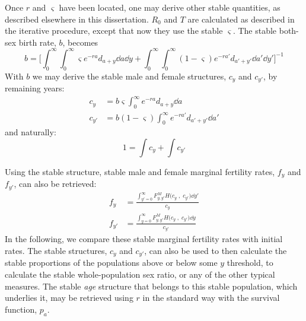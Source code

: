 \FloatBarrier
Once $r$ and $\varsigma$ have been located, one may derive other stable
quantities, as described elsewhere in this dissertation. $R_0$ and $T$ are
calculated as described in the iterative procedure, except that now they use
the stable $\varsigma$. The stable both-sex birth rate, $b$, becomes
\begin{equation}
b = \Bigg[\int_0^\infty  \int _0^\infty \varsigma
 e^{-ra}d_{a+y}\dd a \dd y + \int_0^\infty \int _0^\infty (1-\varsigma)
 e^{-ra'}d_{a'+y'} \dd a' \dd y' \Bigg] ^{-1}
\end{equation}
With $b$ we may derive the stable male and female structures, $c_y$ and
$c_{y'}$, by remaining years:
\begin{align}
\label{eq:schoenexcy}
c_y &= b\varsigma \int _0^\infty e^{-ra}d_{a+y}\dd a \\
c_{y'} &= b(1-\varsigma) \int _0^\infty e^{-ra'}d_{a'+y'}\dd a'
\end{align}
and naturally:
\begin{equation}
1 = \int c_y + \int c_{y'}
\end{equation}

Using the stable structure, stable male and female marginal fertility rates,
$f_y$ and $f_{y'}$, can also be retrieved:
\begin{align}
  f_y &=  \frac{\int_{y'=0}^\infty F_{y,y'}^M H\Big(c_y\;,\; c_{y'}\Big)
  \dd y'}{c_y} \\
  f_{y'} &=  \frac{\int_{y=0}^\infty F_{y,y'}^M H\Big(c_y\;,\; c_{y'}\Big)
  \dd y}{c_{y'}} 
\end{align}
In the following, we compare these stable marginal fertility rates with
initial rates. The stable structures, $c_y$ and $c_{y'}$, can also be used to
then calculate the stable proportions of the populations above or below 
some $y$ threshold, to calculate the stable
whole-population sex ratio, or any of the other typical measures. The stable
\textit{age} structure that belongs to this stable population, which underlies
it, may be retrieved using $r$ in the standard way with the survival
function, $p_a$.

\FloatBarrier